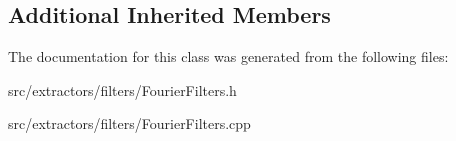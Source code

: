 \subsection*{Additional Inherited Members}


The documentation for this class was generated from the following files\+:\begin{DoxyCompactItemize}
\item 
src/extractors/filters/Fourier\+Filters.\+h\item 
src/extractors/filters/Fourier\+Filters.\+cpp\end{DoxyCompactItemize}
